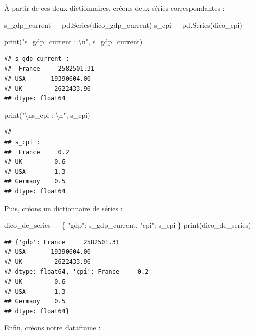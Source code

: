 \documentclass[
  12pt,
]{book}
\newenvironment{Shaded}{\begin{snugshade}}{\end{snugshade}}
\newcommand{\BuiltInTok}[1]{#1}
\newcommand{\CharTok}[1]{\textcolor[rgb]{0.31,0.60,0.02}{#1}}
\newcommand{\NormalTok}[1]{#1}
\newcommand{\OperatorTok}[1]{\textcolor[rgb]{0.81,0.36,0.00}{\textbf{#1}}}
\newcommand{\StringTok}[1]{\textcolor[rgb]{0.31,0.60,0.02}{#1}}
\numberwithin{equation}{section}
\numberwithin{countremarque}{section}
\begin{document}
À partir de ces deux dictionnaires, créons deux séries correspondantes :

\begin{Shaded}
\begin{Highlighting}[]
\NormalTok{s\_gdp\_current }\OperatorTok{=}\NormalTok{ pd.Series(dico\_gdp\_current)}
\NormalTok{s\_cpi }\OperatorTok{=}\NormalTok{ pd.Series(dico\_cpi)}

\BuiltInTok{print}\NormalTok{(}\StringTok{"s\_gdp\_current : }\CharTok{\textbackslash{}n}\StringTok{"}\NormalTok{, s\_gdp\_current)}
\end{Highlighting}
\end{Shaded}

\begin{lstlisting}
## s_gdp_current : 
##  France     2582501.31
## USA       19390604.00
## UK         2622433.96
## dtype: float64
\end{lstlisting}

\begin{Shaded}
\begin{Highlighting}[]
\BuiltInTok{print}\NormalTok{(}\StringTok{"}\CharTok{\textbackslash{}n}\StringTok{s\_cpi : }\CharTok{\textbackslash{}n}\StringTok{"}\NormalTok{, s\_cpi)}
\end{Highlighting}
\end{Shaded}

\begin{lstlisting}
## 
## s_cpi : 
##  France     0.2
## UK         0.6
## USA        1.3
## Germany    0.5
## dtype: float64
\end{lstlisting}

Puis, créons un dictionnaire de séries :

\begin{Shaded}
\begin{Highlighting}[]
\NormalTok{dico\_de\_series }\OperatorTok{=}\NormalTok{ \{}
    \StringTok{"gdp"}\NormalTok{: s\_gdp\_current,}
    \StringTok{"cpi"}\NormalTok{: s\_cpi}
\NormalTok{\}}
\BuiltInTok{print}\NormalTok{(dico\_de\_series)}
\end{Highlighting}
\end{Shaded}

\begin{lstlisting}
## {'gdp': France     2582501.31
## USA       19390604.00
## UK         2622433.96
## dtype: float64, 'cpi': France     0.2
## UK         0.6
## USA        1.3
## Germany    0.5
## dtype: float64}
\end{lstlisting}

Enfin, créons notre dataframe :
\end{document}
